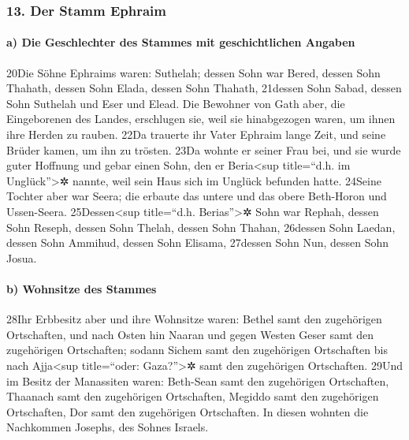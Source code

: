 \hypertarget{der-stamm-ephraim}{%
\subsubsection{13. Der Stamm Ephraim}\label{der-stamm-ephraim}}

\hypertarget{a-die-geschlechter-des-stammes-mit-geschichtlichen-angaben}{%
\paragraph{a) Die Geschlechter des Stammes mit geschichtlichen
Angaben}\label{a-die-geschlechter-des-stammes-mit-geschichtlichen-angaben}}

20Die Söhne Ephraims waren: Suthelah; dessen Sohn war Bered, dessen Sohn
Thahath, dessen Sohn Elada, dessen Sohn Thahath, 21dessen Sohn Sabad,
dessen Sohn Suthelah und Eser und Elead. Die Bewohner von Gath aber, die
Eingeborenen des Landes, erschlugen sie, weil sie hinabgezogen waren, um
ihnen ihre Herden zu rauben. 22Da trauerte ihr Vater Ephraim lange Zeit,
und seine Brüder kamen, um ihn zu trösten. 23Da wohnte er seiner Frau
bei, und sie wurde guter Hoffnung und gebar einen Sohn, den er
Beria\textless sup title=``d.h. im Unglück''\textgreater✲ nannte, weil
sein Haus sich im Unglück befunden hatte. 24Seine Tochter aber war
Seera; die erbaute das untere und das obere Beth-Horon und Ussen-Seera.
25Dessen\textless sup title=``d.h. Berias''\textgreater✲ Sohn war
Rephah, dessen Sohn Reseph, dessen Sohn Thelah, dessen Sohn Thahan,
26dessen Sohn Laedan, dessen Sohn Ammihud, dessen Sohn Elisama, 27dessen
Sohn Nun, dessen Sohn Josua.

\hypertarget{b-wohnsitze-des-stammes}{%
\paragraph{b) Wohnsitze des Stammes}\label{b-wohnsitze-des-stammes}}

28Ihr Erbbesitz aber und ihre Wohnsitze waren: Bethel samt den
zugehörigen Ortschaften, und nach Osten hin Naaran und gegen Westen
Geser samt den zugehörigen Ortschaften; sodann Sichem samt den
zugehörigen Ortschaften bis nach Ajja\textless sup title=``oder:
Gaza?''\textgreater✲ samt den zugehörigen Ortschaften. 29Und im Besitz
der Manassiten waren: Beth-Sean samt den zugehörigen Ortschaften,
Thaanach samt den zugehörigen Ortschaften, Megiddo samt den zugehörigen
Ortschaften, Dor samt den zugehörigen Ortschaften. In diesen wohnten die
Nachkommen Josephs, des Sohnes Israels.

